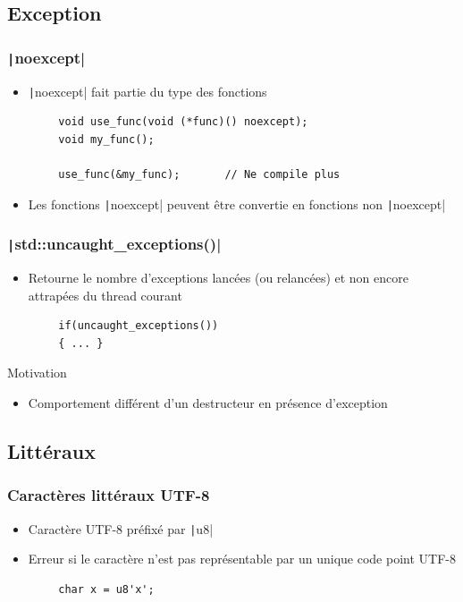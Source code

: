 \documentclass[C++.tex]{subfiles}
\begin{document}
\subsection*{Exception}
\begin{frame}[fragile]
	\frametitle{\texttt|noexcept|}
	\begin{itemize}
		\item \texttt|noexcept| fait partie du type des fonctions
	\end{itemize}

	\begin{verbatim}
		void use_func(void (*func)() noexcept);
		void my_func();

		use_func(&my_func);       // Ne compile plus
	\end{verbatim}


	\begin{itemize}
		\item Les fonctions \texttt|noexcept| peuvent être convertie en fonctions non \texttt|noexcept|
	\end{itemize}
\end{frame}

\begin{frame}[fragile]
	\frametitle{\texttt|std::uncaught_exceptions()|}
	\begin{itemize}
		\item Retourne le nombre d'exceptions lancées (ou relancées) et non encore attrapées du thread courant
	\end{itemize}

	\begin{verbatim}
		if(uncaught_exceptions())
		{ ... }
	\end{verbatim}

	\begin{block}{Motivation}
		\begin{itemize}
			\item Comportement différent d'un destructeur en présence d'exception

		\end{itemize}
	\end{block}
\end{frame}

\subsection*{Littéraux}
\begin{frame}[fragile]
	\frametitle{Caractères littéraux UTF-8}
	\begin{itemize}
		\item Caractère UTF-8 préfixé par \texttt|u8|
		\item Erreur si le caractère n'est pas représentable par un unique code point UTF-8
	\end{itemize}

	\begin{verbatim}
		char x = u8'x';
	\end{verbatim}
\end{frame}
\end{document}
